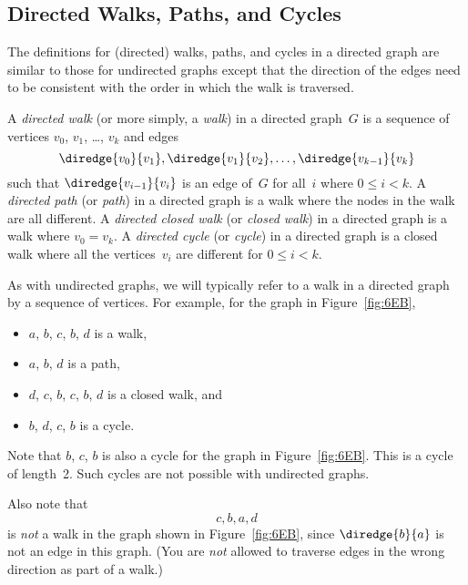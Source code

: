 \subsection{Directed Walks, Paths, and Cycles}

The definitions for (directed) walks, paths, and cycles in a directed
graph are similar to those for undirected graphs except that the
direction of the edges need to be consistent with the order in which
the walk is traversed.

\begin{definition}

A \emph{directed walk} (or more simply, a \emph{walk}) in a directed
graph~$G$ is a sequence of vertices $v_0$, $v_1$, \dots, $v_k$ and
edges
\begin{equation*}
    \diredge{v_0}{v_1}, \diredge{v_1}{v_2}, \dots, \diredge{v_{k - 1}}{v_k}
\end{equation*}
such that $\diredge{v_{i - 1}}{v_i}$ is an edge of~$G$ for all~$i$ where $0
\le i < k$.  A \emph{directed path} (or \emph{path}) in a directed
graph is a walk where the nodes in the walk are all different.  A
\emph{directed closed walk} (or \emph{closed walk}) in a directed
graph is a walk where $v_0 = v_k$.  A \emph{directed cycle} (or
\emph{cycle}) in a directed graph is a closed walk where all the
vertices~$v_i$ are different for $0 \le i < k$.
\end{definition}

As with undirected graphs, we will typically refer to a walk in a
directed graph by a sequence of vertices.  For example, for the graph
in Figure~\ref{fig:6EB},
\begin{itemize}

\item
$a$, $b$, $c$, $b$, $d$ is a walk,

\item
$a$, $b$, $d$ is a path,

\item
$d$, $c$, $b$, $c$, $b$, $d$ is a closed walk, and

\item
$b$, $d$, $c$, $b$ is a cycle.

\end{itemize}

Note that $b$, $c$, $b$ is also a cycle for the graph in
Figure~\ref{fig:6EB}.  This is a cycle of length~2.  Such cycles are
not possible with undirected graphs.

Also note that
\begin{equation*}
    c, b, a, d
\end{equation*}
is \emph{not} a walk in the graph shown in Figure~\ref{fig:6EB}, since
$\diredge{b}{a}$ is not an edge in this graph.  (You are \emph{not}
allowed to traverse edges in the wrong direction as part of a walk.)

